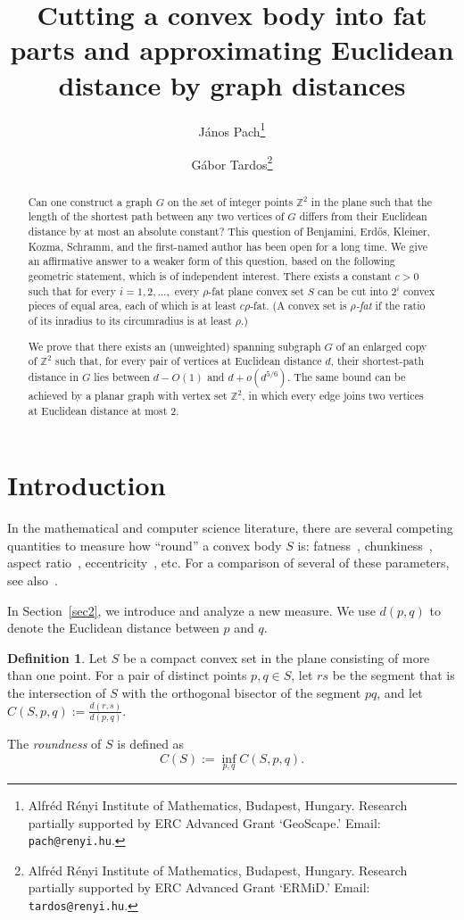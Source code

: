 \documentclass[12pt]{article}
\title{Cutting a convex body into fat parts and approximating  Euclidean distance by graph distances }
\author{J\'anos Pach\thanks{Alfr\'ed R\'enyi Institute of Mathematics, Budapest, Hungary. Research partially supported by ERC Advanced Grant `GeoScape.' Email: \texttt{pach@renyi.hu}.}
\and G\'abor Tardos\thanks{Alfr\'ed R\'enyi Institute of Mathematics, Budapest, Hungary. Research partially supported by ERC Advanced Grant `ERMiD.' Email: \texttt{tardos@renyi.hu}.}}
\theoremstyle{plain}
\theoremstyle{definition}
\newtheorem{definition}{Definition}
\theoremstyle{remark}
\newcommand{\ZZ}{{\mathbb Z}}
\begin{document}
\date{}

\maketitle


\begin{abstract}
Can one construct a graph $G$ on the set of integer points $\ZZ^2$ in the plane such that the length of the shortest path between any two vertices of $G$ differs from their Euclidean distance by at most an absolute constant? This question of Benjamini, Erd\H os, Kleiner, Kozma, Schramm, and the first-named author has been open for a long time. We give an affirmative answer to a weaker form of this question, based on the following geometric statement, which is of independent interest. There exists a constant $c>0$ such that for every $i=1,2,\ldots,$ every $\rho$-fat plane convex set $S$ can be cut into $2^i$ convex pieces of equal area, each of which is at least $c\rho$-fat. (A convex set is \emph{$\rho$-fat} if the ratio of its inradius to its circumradius is at least $\rho$.)

We prove that there exists an (unweighted) spanning subgraph $G$ of an enlarged copy of $\ZZ^2$ such that, for every pair of vertices at Euclidean distance $d$, their shortest-path distance in $G$ lies between $d-O(1)$ and $d+o(d^{5/6})$. The same bound can be achieved by a planar graph with vertex set $\ZZ^2$, in which every edge joins two vertices at Euclidean distance at most 2.
\end{abstract}

\section{Introduction}

In the mathematical and computer science literature, there are several competing quantities to measure how ``round'' a convex body $S$ is: fatness~\cite{vdSHO93, vdSO94, deBKV02, Gr08}, chunkiness~\cite{Ci78}, aspect ratio~\cite{Sh14}, eccentricity~\cite{Le59}, etc. For a comparison of several of these parameters, see also~\cite{deBKV02,Gr08}.

In Section~\ref{sec2}, we introduce and analyze a new measure. We use $d(p,q)$ to denote the Euclidean distance between $p$ and $q$.

\begin{definition}\label{roundness}
Let $S$ be a compact convex set in the plane consisting of more than one point. For a pair of distinct points $p,q\in S$, let $rs$ be the segment that is the intersection of $S$ with the orthogonal bisector of the segment $pq$, and let $C(S,p,q):=\frac{d(r,s)}{d(p,q)}$.

The \emph{roundness} of $S$ is defined as
$$C(S):=\inf_{p,q}C(S,p,q).$$
\end{definition}
\end{document}
